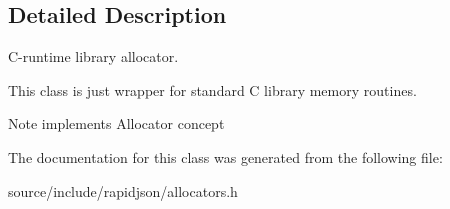 \subsection{Detailed Description}
C-\/runtime library allocator. 

This class is just wrapper for standard C library memory routines. \begin{DoxyNote}{Note}
implements Allocator concept 
\end{DoxyNote}


The documentation for this class was generated from the following file\+:\begin{DoxyCompactItemize}
\item 
source/include/rapidjson/allocators.\+h\end{DoxyCompactItemize}
